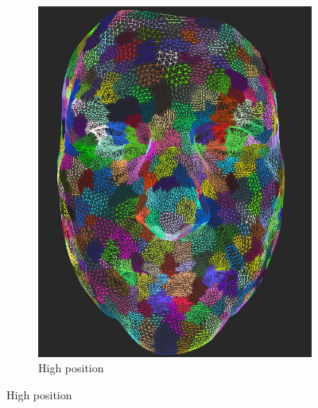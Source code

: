 \begin{figure}[h]
\begin{subfigure}{0.4\textwidth}
	\includegraphics[width=\textwidth]{./img/meshdiff-high_position.PNG}
	\caption{High position}
	\label{fig:meshdiff-high_position}
	\end{subfigure}
    

\end{figure}
